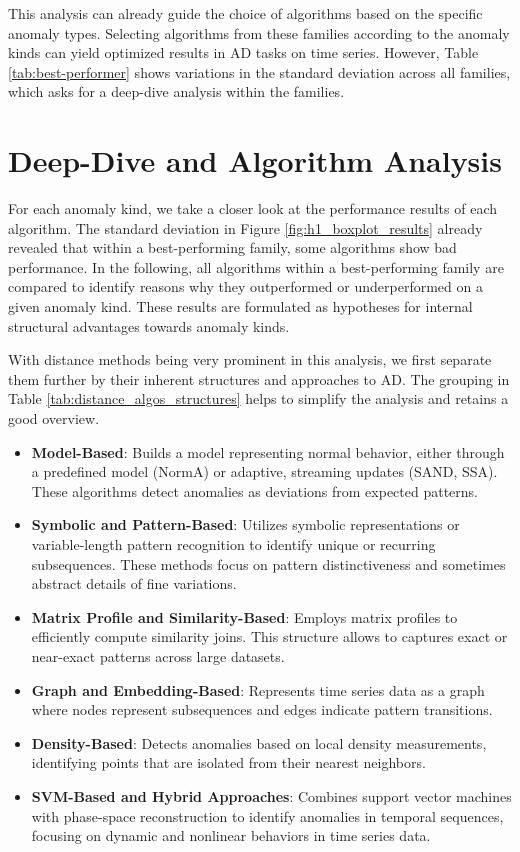 This analysis can already guide the choice of algorithms based on the specific anomaly types. Selecting algorithms from these families according to the anomaly kinds can yield optimized results in AD tasks on time series. However, Table \ref{tab:best-performer} shows variations in the standard deviation across all families, which asks for a deep-dive analysis within the families.


\section{Deep-Dive and Algorithm Analysis}
For each anomaly kind, we take a closer look at the performance results of each algorithm. The standard deviation in Figure \ref{fig:h1_boxplot_results} already revealed that within a best-performing family, some algorithms show bad performance. In the following, all algorithms within a best-performing family are compared to identify reasons why they outperformed or underperformed on a given anomaly kind. These results are formulated as hypotheses for internal structural advantages towards anomaly kinds. 

With distance methods being very prominent in this analysis, we first separate them further by their inherent structures and approaches to AD. The grouping in Table \ref{tab:distance_algos_structures} helps to simplify the analysis and retains a good overview.



\begin{itemize}
    \item \textbf{Model-Based}: Builds a model representing normal behavior, either through a predefined model (NormA) or adaptive, streaming updates (SAND, SSA). These algorithms detect anomalies as deviations from expected patterns.
    \item \textbf{Symbolic and Pattern-Based}: Utilizes symbolic representations or variable-length pattern recognition to identify unique or recurring subsequences. These methods focus on pattern distinctiveness and sometimes abstract details of fine variations.
    \item \textbf{Matrix Profile and Similarity-Based}: Employs matrix profiles to efficiently compute similarity joins. This structure allows to captures exact or near-exact patterns across large datasets.
    \item \textbf{Graph and Embedding-Based}: Represents time series data as a graph where nodes represent subsequences and edges indicate pattern transitions. 
    \item \textbf{Density-Based}: Detects anomalies based on local density measurements, identifying points that are isolated from their nearest neighbors.
    \item \textbf{SVM-Based and Hybrid Approaches}: Combines support vector machines with phase-space reconstruction to identify anomalies in temporal sequences, focusing on dynamic and nonlinear behaviors in time series data.
\end{itemize}


